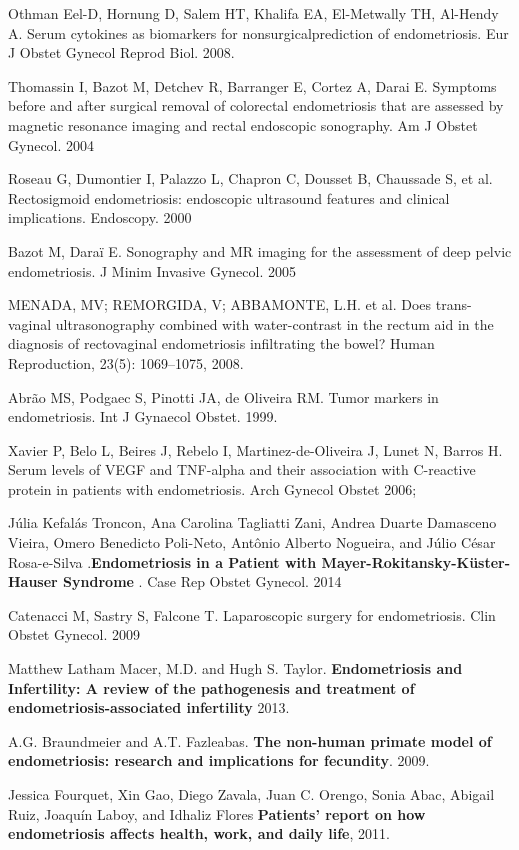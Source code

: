 \documentclass[12pt]{article} %
\begin{document}
Othman Eel-D, Hornung D, Salem HT, Khalifa EA, El-Metwally
TH, Al-Hendy A. Serum cytokines as biomarkers for nonsurgicalprediction of endometriosis. Eur J Obstet Gynecol Reprod Biol.
2008.

Thomassin I, Bazot M, Detchev R, Barranger E, Cortez A,
Darai E. Symptoms before and after surgical removal of
colorectal endometriosis that are assessed by magnetic
resonance imaging and rectal endoscopic sonography. Am J
Obstet Gynecol. 2004 

Roseau G, Dumontier I, Palazzo L, Chapron C, Dousset B,
Chaussade S, et al. Rectosigmoid endometriosis: endoscopic
ultrasound features and clinical implications. Endoscopy.
2000 

Bazot M, Daraï E. Sonography and MR imaging for the
assessment of deep pelvic endometriosis. J Minim Invasive
Gynecol. 2005

MENADA, MV; REMORGIDA, V; ABBAMONTE, L.H. et al. Does trans-
vaginal ultrasonography combined with water-contrast in the rectum aid in
the diagnosis of rectovaginal endometriosis infiltrating the bowel? Human
Reproduction, 23(5): 1069–1075, 2008.

Abrão MS, Podgaec S, Pinotti JA, de Oliveira RM. Tumor markers
in endometriosis. Int J Gynaecol Obstet. 1999.

Xavier P, Belo L, Beires J, Rebelo I, Martinez-de-Oliveira J, Lunet N, Barros H.
Serum levels of VEGF and TNF-alpha and their association with C-reactive protein in patients with endometriosis. Arch Gynecol Obstet 2006;

Júlia Kefalás Troncon, Ana Carolina Tagliatti Zani, Andrea Duarte Damasceno Vieira, Omero Benedicto Poli-Neto, Antônio Alberto Nogueira, and Júlio César Rosa-e-Silva .\textbf{Endometriosis in a Patient with Mayer-Rokitansky-Küster-Hauser Syndrome} . Case Rep Obstet Gynecol. 2014

Catenacci M, Sastry S, Falcone T. Laparoscopic surgery for endometriosis. Clin Obstet Gynecol. 2009

Matthew Latham Macer, M.D. and Hugh S. Taylor. \textbf{Endometriosis and Infertility: A review of the pathogenesis and treatment of endometriosis-associated infertility} 2013.

A.G. Braundmeier and A.T. Fazleabas. \textbf{The non-human primate model of endometriosis: research and implications for fecundity}. 2009.

Jessica Fourquet, Xin Gao, Diego Zavala, Juan C. Orengo, Sonia Abac, Abigail Ruiz, Joaquín Laboy, and Idhaliz Flores\textbf{ Patients’ report on how endometriosis affects health, work, and daily life}, 2011.
\end{document}
